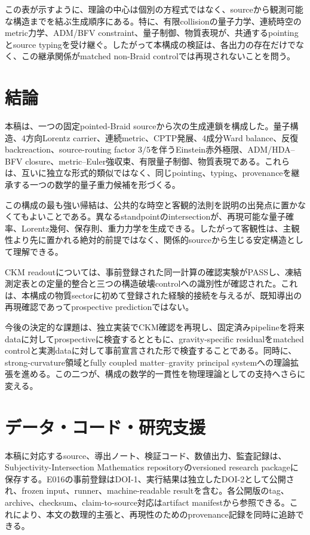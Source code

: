 \documentclass[11pt]{article}
\theoremstyle{definition}
\theoremstyle{remark}
\begin{document}
この表が示すように、理論の中心は個別の方程式ではなく、sourceから観測可能な構造までを結ぶ生成順序にある。特に、有限collisionの量子力学、連続時空のmetric力学、ADM/BFV constraint、量子制御、物質表現が、共通するpointingとsource typingを受け継ぐ。したがって本構成の検証は、各出力の存在だけでなく、この継承関係がmatched non-Braid controlでは再現されないことを問う。

\section{結論}

本稿は、一つの固定pointed-Braid sourceから次の生成連鎖を構成した。量子構造、4方向Lorentz carrier、連続metric、CPTP発展、4成分Ward balance、反復backreaction、source-routing factor $3/5$を伴うEinstein赤外極限、ADM/HDA--BFV closure、metric--Euler強収束、有限量子制御、物質表現である。これらは、互いに独立な形式的類似ではなく、同じpointing、typing、provenanceを継承する一つの数学的量子重力候補を形づくる。

この構成の最も強い帰結は、公共的な時空と客観的法則を説明の出発点に置かなくてもよいことである。異なるstandpointのintersectionが、再現可能な量子確率、Lorentz幾何、保存則、重力力学を生成できる。したがって客観性は、主観性より先に置かれる絶対的前提ではなく、関係的sourceから生じる安定構造として理解できる。

CKM readoutについては、事前登録された同一計算の確認実験がPASSし、凍結測定表との定量的整合と三つの構造破壊controlへの識別性が確認された。これは、本構成の物質sectorに初めて登録された経験的接続を与えるが、既知導出の再現確認であってprospective predictionではない。

今後の決定的な課題は、独立実装でCKM確認を再現し、固定済みpipelineを将来dataに対してprospectiveに検査するとともに、gravity-specific residualをmatched controlと実測dataに対して事前宣言された形で検査することである。同時に、strong-curvature領域とfully coupled matter--gravity principal systemへの理論拡張を進める。この二つが、構成の数学的一貫性を物理理論としての支持へさらに変える。

\section{データ・コード・研究支援}

本稿に対応するsource、導出ノート、検証コード、数値出力、監査記録は、Subjectivity-Intersection Mathematics repositoryのversioned research packageに保存する。E016の事前登録はDOI-1、実行結果は独立したDOI-2として公開され、frozen input、runner、machine-readable resultを含む\cite{e016prereg,e016result}。各公開版のtag、archive、checksum、claim-to-source対応はartifact manifestから参照できる。これにより、本文の数理的主張と、再現性のためのprovenance記録を同時に追跡できる。
\end{document}
